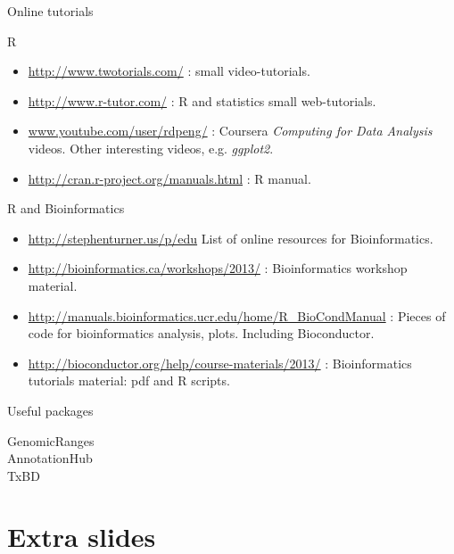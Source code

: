\documentclass[10pt]{beamer}
\begin{document}
\begin{frame}[shrink=10]{Online tutorials}
  \begin{block}{R}
    \begin{itemize}
    \item \url{http://www.twotorials.com/} : small video-tutorials.
    \item \url{http://www.r-tutor.com/} : R and statistics small web-tutorials.
    \item \url{www.youtube.com/user/rdpeng/} : Coursera {\it Computing for Data Analysis} videos. Other interesting videos, e.g. {\it ggplot2}.
    \item \url{http://cran.r-project.org/manuals.html} : R manual.
    \end{itemize}
  \end{block}
  \begin{block}{R and Bioinformatics}
    \begin{itemize}
    \item \url{http://stephenturner.us/p/edu} List of online resources for Bioinformatics.
    \item \url{http://bioinformatics.ca/workshops/2013/} : Bioinformatics workshop material.
    \item \url{http://manuals.bioinformatics.ucr.edu/home/R_BioCondManual} : Pieces of code for bioinformatics analysis, plots. Including Bioconductor.
    \item \url{http://bioconductor.org/help/course-materials/2013/} : Bioinformatics tutorials material: pdf and R scripts.
    \end{itemize}
  \end{block}
\end{frame}

\begin{frame}{Useful packages}
  \begin{description}
  \item[GenomicRanges] 
  \item[AnnotationHub]
  \item[TxBD]
  \end{description}
\end{frame}

\section{Extra slides}

\end{document}
